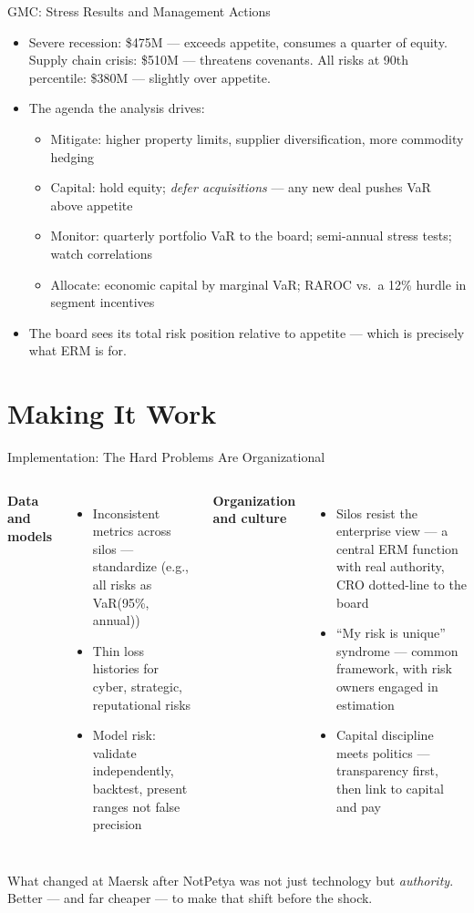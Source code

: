 \documentclass[11pt, aspectratio=169]{beamer}
\begin{document}
\begin{frame}{GMC: Stress Results and Management Actions}
\begin{itemize}
  \item Severe recession: \$475M --- exceeds appetite, consumes a quarter of equity. Supply chain crisis: \$510M --- threatens covenants. All risks at 90th percentile: \$380M --- slightly over appetite.
  \item The agenda the analysis drives:
  \begin{itemize}
    \item Mitigate: higher property limits, supplier diversification, more commodity hedging
    \item Capital: hold equity; \emph{defer acquisitions} --- any new deal pushes VaR above appetite
    \item Monitor: quarterly portfolio VaR to the board; semi-annual stress tests; watch correlations
    \item Allocate: economic capital by marginal VaR; RAROC vs.\ a 12\% hurdle in segment incentives
  \end{itemize}
  \item The board sees its total risk position relative to appetite --- which is precisely what ERM is for.
\end{itemize}
\end{frame}

\section{Making It Work}

\begin{frame}{Implementation: The Hard Problems Are Organizational}
\begin{columns}[T]
\textbf{Data and models}
\begin{itemize}
  \item Inconsistent metrics across silos --- standardize (e.g., all risks as VaR(95\%, annual))
  \item Thin loss histories for cyber, strategic, reputational risks
  \item Model risk: validate independently, backtest, present ranges not false precision
\end{itemize}
\textbf{Organization and culture}
\begin{itemize}
  \item Silos resist the enterprise view --- a central ERM function with real authority, CRO dotted-line to the board
  \item ``My risk is unique'' syndrome --- common framework, with risk owners engaged in estimation
  \item Capital discipline meets politics --- transparency first, then link to capital and pay
\end{itemize}
\end{columns}
\medskip
What changed at Maersk after NotPetya was not just technology but \emph{authority}. Better --- and far cheaper --- to make that shift before the shock.
\end{frame}
\end{document}

